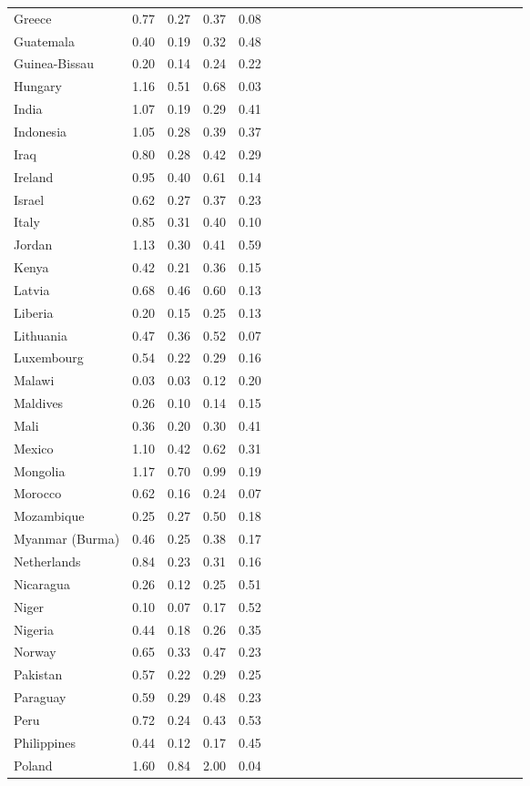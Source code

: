 \begin{ThreePartTable}
\begin{longtable}[t]{l|r|rrrl|r|rrrl|r|rrrl|r|rrrl|r|rrr}
Greece & 0.77 & 0.27 & 0.37 & 0.08\\
Guatemala & 0.40 & 0.19 & 0.32 & 0.48\\
Guinea-Bissau & 0.20 & 0.14 & 0.24 & 0.22\\
Hungary & 1.16 & 0.51 & 0.68 & 0.03\\
India & 1.07 & 0.19 & 0.29 & 0.41\\
Indonesia & 1.05 & 0.28 & 0.39 & 0.37\\
Iraq & 0.80 & 0.28 & 0.42 & 0.29\\
Ireland & 0.95 & 0.40 & 0.61 & 0.14\\
Israel & 0.62 & 0.27 & 0.37 & 0.23\\
Italy & 0.85 & 0.31 & 0.40 & 0.10\\
Jordan & 1.13 & 0.30 & 0.41 & 0.59\\
Kenya & 0.42 & 0.21 & 0.36 & 0.15\\
Latvia & 0.68 & 0.46 & 0.60 & 0.13\\
Liberia & 0.20 & 0.15 & 0.25 & 0.13\\
Lithuania & 0.47 & 0.36 & 0.52 & 0.07\\
Luxembourg & 0.54 & 0.22 & 0.29 & 0.16\\
Malawi & 0.03 & 0.03 & 0.12 & 0.20\\
Maldives & 0.26 & 0.10 & 0.14 & 0.15\\
Mali & 0.36 & 0.20 & 0.30 & 0.41\\
Mexico & 1.10 & 0.42 & 0.62 & 0.31\\
Mongolia & 1.17 & 0.70 & 0.99 & 0.19\\
Morocco & 0.62 & 0.16 & 0.24 & 0.07\\
Mozambique & 0.25 & 0.27 & 0.50 & 0.18\\
Myanmar (Burma) & 0.46 & 0.25 & 0.38 & 0.17\\
Netherlands & 0.84 & 0.23 & 0.31 & 0.16\\
Nicaragua & 0.26 & 0.12 & 0.25 & 0.51\\
Niger & 0.10 & 0.07 & 0.17 & 0.52\\
Nigeria & 0.44 & 0.18 & 0.26 & 0.35\\
Norway & 0.65 & 0.33 & 0.47 & 0.23\\
Pakistan & 0.57 & 0.22 & 0.29 & 0.25\\
Paraguay & 0.59 & 0.29 & 0.48 & 0.23\\
Peru & 0.72 & 0.24 & 0.43 & 0.53\\
Philippines & 0.44 & 0.12 & 0.17 & 0.45\\
Poland & 1.60 & 0.84 & 2.00 & 0.04\\

\end{longtable}
\end{ThreePartTable}
